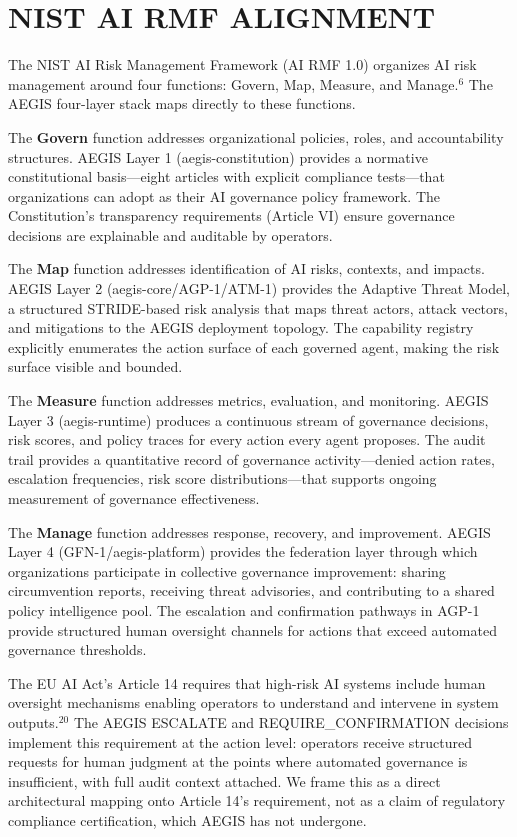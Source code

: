 \documentclass{IEEEcsmag}
\begin{document}
\section{NIST AI RMF ALIGNMENT}

The NIST AI Risk Management Framework (AI RMF 1.0) organizes AI risk management around four functions: Govern, Map, Measure, and Manage.$^{6}$ The AEGIS four-layer stack maps directly to these functions.

The {\bf Govern} function addresses organizational policies, roles, and accountability structures. AEGIS Layer 1 (aegis-constitution) provides a normative constitutional basis---eight articles with explicit compliance tests---that organizations can adopt as their AI governance policy framework. The Constitution's transparency requirements (Article VI) ensure governance decisions are explainable and auditable by operators.

The {\bf Map} function addresses identification of AI risks, contexts, and impacts. AEGIS Layer 2 (aegis-core/AGP-1/ATM-1) provides the Adaptive Threat Model, a structured STRIDE-based risk analysis that maps threat actors, attack vectors, and mitigations to the AEGIS deployment topology. The capability registry explicitly enumerates the action surface of each governed agent, making the risk surface visible and bounded.

The {\bf Measure} function addresses metrics, evaluation, and monitoring. AEGIS Layer 3 (aegis-runtime) produces a continuous stream of governance decisions, risk scores, and policy traces for every action every agent proposes. The audit trail provides a quantitative record of governance activity---denied action rates, escalation frequencies, risk score distributions---that supports ongoing measurement of governance effectiveness.

The {\bf Manage} function addresses response, recovery, and improvement. AEGIS Layer 4 (GFN-1/aegis-platform) provides the federation layer through which organizations participate in collective governance improvement: sharing circumvention reports, receiving threat advisories, and contributing to a shared policy intelligence pool. The escalation and confirmation pathways in AGP-1 provide structured human oversight channels for actions that exceed automated governance thresholds.

The EU AI Act's Article 14 requires that high-risk AI systems include human oversight mechanisms enabling operators to understand and intervene in system outputs.$^{20}$ The AEGIS ESCALATE and REQUIRE\_CONFIRMATION decisions implement this requirement at the action level: operators receive structured requests for human judgment at the points where automated governance is insufficient, with full audit context attached. We frame this as a direct architectural mapping onto Article 14's requirement, not as a claim of regulatory compliance certification, which AEGIS has not undergone.
\end{document}
